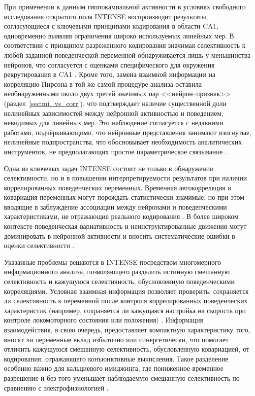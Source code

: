 При применении к данным гиппокампальной активности в условиях свободного исследования открытого поля INTENSE воспроизводит результаты, согласующиеся с ключевыми принципами кодирования в области CA1, одновременно выявляя ограничения широко используемых линейных мер. В соответствии с принципом разреженного кодирования значимая селективность к любой заданной поведенческой переменной обнаруживается лишь у меньшинства нейронов, что согласуется с оценками специфического для окружения рекрутирования в CA1 \cite{Wilson1993, Epsztein2011}. Кроме того, замена взаимной информации на корреляцию Пирсона в той же самой процедуре анализа оставила необнаруженными около двух третей значимых пар <<нейрон--признак>> (раздел~\ref{sec:mi_vs_corr}), что подтверждает наличие существенной доли нелинейных зависимостей между нейронной активностью и поведением, невидимых для линейных мер. Это наблюдение согласуется с недавними работами, подчёркивающими, что нейронные представления занимают изогнутые, нелинейные подпространства, что обосновывает необходимость аналитических инструментов, не предполагающих простое параметрическое связывание \cite{Altan2021, De2023, intdim}.

Одна из ключевых задач INTENSE состоит не только в обнаружении селективности, но и в повышении интерпретируемости результатов при наличии коррелированных поведенческих переменных. Временная автокорреляция и ковариация переменных могут порождать статистически значимые, но при этом вводящие в заблуждение ассоциации между нейронами и поведенческими характеристиками, не отражающие реального кодирования \cite{Harris2021nonsense}. В более широком контексте поведенческая вариативность и неинструктированные движения могут доминировать в нейронной активности и вносить систематические ошибки в оценки селективности \cite{Stringer2019, Musall2019}.

Указанные проблемы решаются в INTENSE посредством многомерного информационного анализа, позволяющего разделить истинную смешанную селективность и кажущуюся селективность, обусловленную поведенческими корреляциями. Условная взаимная информация позволяет проверить, сохраняется ли селективность к переменной после контроля коррелированных поведенческих характеристик (например, сохраняется ли кажущаяся настройка на скорость при контроле локомоторного состояния или положения) \cite{kropff2015speed}. Информация взаимодействия, в свою очередь, предоставляет компактную характеристику того, вносят ли переменные вклад избыточно или синергетически, что помогает отличить кажущуюся смешанную селективность, обусловленную ковариацией, от кодирования, отражающего конъюнктивные вычисления. Такое разделение особенно важно для кальциевого имиджинга, где пониженное временное разрешение и без того уменьшает наблюдаемую смешанную селективность по сравнению с электрофизиологией \cite{Wei2020}.

